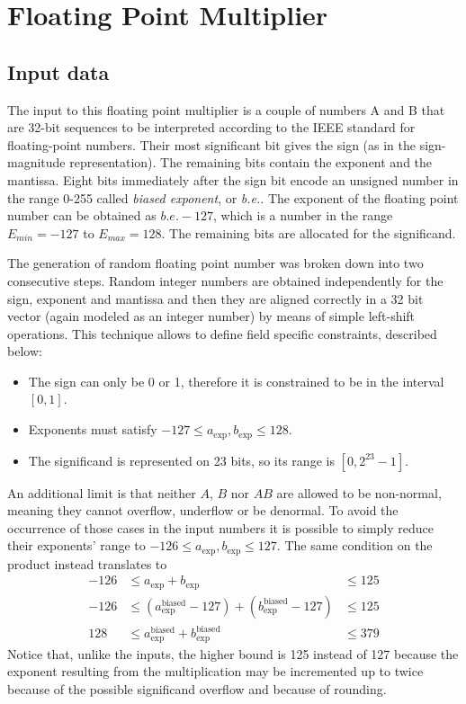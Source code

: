 \chapter{Floating Point Multiplier}

\section{Input data}
The input to this floating point multiplier is a couple of numbers A and B that are 32-bit sequences to be interpreted according to the IEEE standard for floating-point numbers. Their most significant bit gives the sign (as in the sign-magnitude representation). The remaining bits contain the exponent and the mantissa. Eight bits immediately after the sign bit encode an unsigned number in the range 0-255 called \textit{biased exponent}, or \textit{b.e.}. The exponent of the floating point number can be obtained as $\textit{b.e.} - 127$, which is a number in the range $E_{min} = -127$ to $E_{max}=128$.
The remaining bits are allocated for the significand.

The generation of random floating point number was broken down into two consecutive steps. Random integer numbers are obtained independently for the sign, exponent and mantissa and then they are aligned correctly in a 32 bit vector (again modeled as an integer number) by means of simple left-shift operations. This technique allows to define field specific constraints, described below:
\begin{itemize}
    \item The sign can only be 0 or 1, therefore it is constrained to be in the interval $[0,1]$.
    \item Exponents must satisfy $-127 \leq a_\text{exp}, b_\text{exp} \leq 128$.
    \item The significand is represented on 23 bits, so its range is $[0, 2^{23}-1]$.
\end{itemize}
An additional limit is that neither $A$, $B$ nor $AB$ are allowed to be non-normal, meaning they cannot overflow, underflow or be denormal. To avoid the occurrence of those cases in the input numbers it is possible to simply reduce their exponents' range to $-126 \leq a_\text{exp}, b_\text{exp} \leq 127$. The same condition on the product instead translates to
\begin{align}
-126 &\leq  a_\text{exp}                      + b_\text{exp} &\leq 125 \nonumber\\
-126 &\leq (a_\text{exp}^\text{biased} - 127) + (b_\text{exp}^\text{biased} - 127) &\leq 125 \nonumber\\
 128 &\leq  a_\text{exp}^\text{biased}        + b_\text{exp}^\text{biased} &\leq 379 \label{eqn:constraint}
\end{align}
Notice that, unlike the inputs, the higher bound is 125 instead of 127 because the exponent resulting from the multiplication may be incremented up to twice because of the possible significand overflow and because of rounding.

